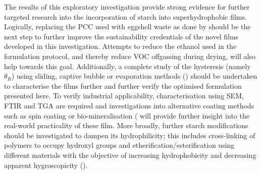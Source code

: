 The results of this exploratory investigation provide strong evidence for further targeted research into the incorporation of starch into superhydrophobic films. Logically, replacing the PCC used with eggshell waste as done by \cite{khoo_lim_2017} should be the next step to further improve the sustainability credentials of the novel films developed in this investigation. Attempts to reduce the ethanol used in the formulation protocol, and thereby reduce VOC offgassing during drying,  will also help towards this goal. Additionally, a complete study of the hysteresis (namely $\theta_R$) using sliding, captive bubble or evaporation methods (\cite{eral}) should be undertaken to characterise the films further and further verify the optimised formulation presented here. To verify industrial applicability, characterisation using SEM, FTIR and TGA are required and investigations into alternative coating methods such as spin coating or bio-mineralisation (\cite{tang_chang_li_ge_niu_wang_jiang_sun_2021} will provide further insight into the real-world practicality of these film. More broadly, further starch modifications should be investigated to dampen its hydrophilicity; this includes cross-linking of polymers to occupy hydroxyl groups and etherification/esterification using different materials with the objective of increasing hydrophobicity and decreasing apparent hygroscopicity (\cite{wang}).  

